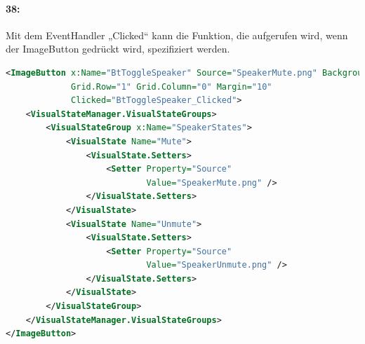\paragraph{38:} Mit dem EventHandler „Clicked“ kann die Funktion, die aufgerufen wird, wenn der ImageButton gedrückt wird, spezifiziert werden.
\begin{lstlisting}[firstnumber=43,language=xml]
<ImageButton x:Name="BtToggleSpeaker" Source="SpeakerMute.png" BackgroundColor="Transparent"
             Grid.Row="1" Grid.Column="0" Margin="10"
             Clicked="BtToggleSpeaker_Clicked">
    <VisualStateManager.VisualStateGroups>
        <VisualStateGroup x:Name="SpeakerStates">
            <VisualState Name="Mute">
                <VisualState.Setters>
                    <Setter Property="Source"
                            Value="SpeakerMute.png" />
                </VisualState.Setters>
            </VisualState>
            <VisualState Name="Unmute">
                <VisualState.Setters>
                    <Setter Property="Source"
                            Value="SpeakerUnmute.png" />
                </VisualState.Setters>
            </VisualState>
        </VisualStateGroup>
    </VisualStateManager.VisualStateGroups>
</ImageButton>
\end{lstlisting}
